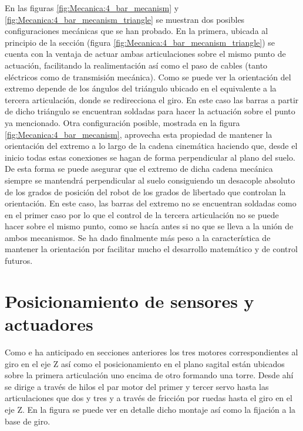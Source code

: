    	En las figuras \ref{fig:Mecanica:4_bar_mecanism} y \ref{fig:Mecanica:4_bar_mecanism_triangle} se muestran dos posibles configuraciones mecánicas que se han probado. En la primera, ubicada al principio de la sección (figura \ref{fig:Mecanica:4_bar_mecanism_triangle}) se cuenta con la ventaja de actuar ambas articulaciones sobre el mismo punto de actuación, facilitando la realimentación así como el paso de cables (tanto eléctricos como de transmisión mecánica). Como se puede ver la orientación del extremo depende de los ángulos del triángulo ubicado en el equivalente a la tercera articulación, donde se redirecciona el giro. En este caso las barras a partir de dicho triángulo se encuentran soldadas para hacer la actuación sobre el punto ya mencionado. Otra configuración posible, mostrada en la figura \ref{fig:Mecanica:4_bar_mecanism}, aprovecha esta propiedad de mantener la orientación del extremo a lo largo de la cadena cinemática haciendo que, desde el inicio todas estas conexiones se hagan de forma perpendicular al plano del suelo. De esta forma se puede asegurar que el extremo de dicha cadena mecánica siempre se mantendrá perpendicular al suelo consiguiendo un desacople absoluto de los grados de posición del robot de los grados de libertado que controlan la orientación. En este caso, las barras del extremo no se encuentran soldadas como en el primer caso por lo que el control de la tercera articulación no se puede hacer sobre el mismo punto, como se hacía antes si no que se lleva a la unión de ambos mecanismos. Se ha dado finalmente más peso a la característica de mantener la orientación por facilitar mucho el desarrollo matemático y de control futuros.

\section{Posicionamiento de sensores y actuadores} \label{sec:Mecanica:sensores_actuadore}

	Como e ha anticipado en secciones anteriores los tres motores correspondientes al giro en el eje Z así como el posicionamiento en el plano sagital están ubicados sobre la primera articulación uno encima de otro formando una torre. Desde ahí se dirige a través de hilos el par motor del primer y tercer servo hasta las articulaciones que dos y tres y a través de fricción por ruedas hasta el giro en el eje Z. En la figura \completar se puede ver en detalle dicho montaje así como la fijación a la base de giro.
	\\

